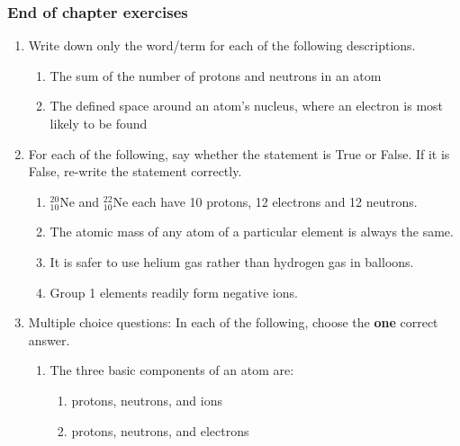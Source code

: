             \subsubsection{ End of chapter exercises}
            \nopagebreak
      \label{m38741*id263110}\begin{enumerate}[noitemsep, label=\textbf{\arabic*}. ] 
            \label{m38741*uid189}\item Write down only the word/term for each of the following descriptions.
\label{m38741*id263126}\begin{enumerate}[noitemsep, label=\textbf{\alph*}. ] 
            \label{m38741*uid190}\item The sum of the number of protons and neutrons in an atom
\label{m38741*uid191}\item The defined space around an atom's nucleus, where an electron is most likely to be found
\end{enumerate}
                \label{m38741*uid192}\item For each of the following, say whether the statement is True or False. If it is False, re-write the statement correctly.
\label{m38741*id263169}\begin{enumerate}[noitemsep, label=\textbf{\alph*}. ] 
            \label{m38741*uid193}\item $_{10}^{20}\mathrm{Ne}$ and $_{10}^{22}\mathrm{Ne}$ each have 10 protons, 12 electrons and 12 neutrons.
\label{m38741*uid194}\item The atomic mass of any atom of a particular element is always the same.
\label{m38741*uid195}\item It is safer to use helium gas rather than hydrogen gas in balloons.
\label{m38741*uid196}\item Group 1 elements readily form negative ions.
\end{enumerate}
                \label{m38741*uid197}\item Multiple choice questions: In each of the following, choose the \textbf{one} correct answer.
\label{m38741*id263273}\begin{enumerate}[noitemsep, label=\textbf{\alph*}. ] 
            \label{m38741*uid198}\item The three basic components of an atom are:
\label{m38741*id263289}\begin{enumerate}[noitemsep, label=\textbf{\alph*}. ] 
            \label{m38741*uid199}\item protons, neutrons, and ions
\label{m38741*uid200}\item protons, neutrons, and electrons

\end{enumerate}
\end{enumerate}
\end{enumerate}
